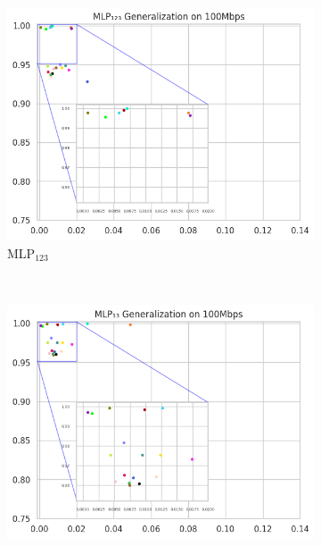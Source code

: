 \documentclass[a4paper,fleqn]{cas-sc}
\begin{document}
\begin{figure}[h!]
\begin{minipage}[t]{0.46\textwidth}
	\end{minipage}
	\hfill%
	\begin{minipage}[t]{0.46\textwidth} %
			\begin{subfigure}[t]{0.33\textwidth}
				\includegraphics[draft=false, width=\textwidth]{./figs/Generalizacao-MLP123-100Mbps.png} 
				\caption{MLP$_{123}$}
				\label{fig:Generalizacao-MLP123-100Mbps}
			\end{subfigure}%
			~
			\begin{subfigure}[t]{0.33\textwidth}
				\includegraphics[draft=false, width=\textwidth]{./figs/Generalizacao-MLP13-100Mbps.png} 

\end{subfigure}
\end{minipage}
\end{figure}
\end{document}
